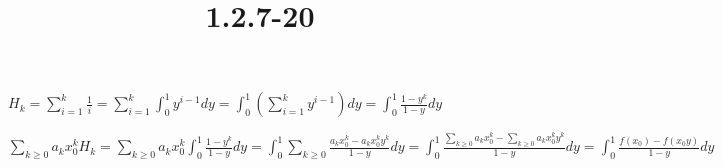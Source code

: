 \documentclass{article}
\title{1.2.7-20}
\begin{document}
\maketitle

\( H_k = \sum_{i=1}^k \frac{1}{i} = \sum_{i=1}^{k} \int_0^1 y^{i-1}dy = \int_0^1 (\sum_{i=1}^k y^{i-1}) dy = \int_0^1 \frac{1-y^k}{1-y} dy \)

\( \sum_{k \geq 0} a_kx_0^k H_k = \sum_{k \geq 0} a_kx_0^k \int_0^1 \frac{1-y^k}{1-y} dy = \int_0^1 \sum_{k \geq 0} \frac{a_kx_0^k - a_kx_0^ky^k}{1-y} dy = \int_0^1 \frac{\sum_{k \geq 0}a_kx_0^k - \sum_{k \geq 0}a_kx_0^ky^k}{1-y} dy = \int_0^1 \frac{f(x_0) - f(x_0y)}{1-y} dy \)
\end{document}
